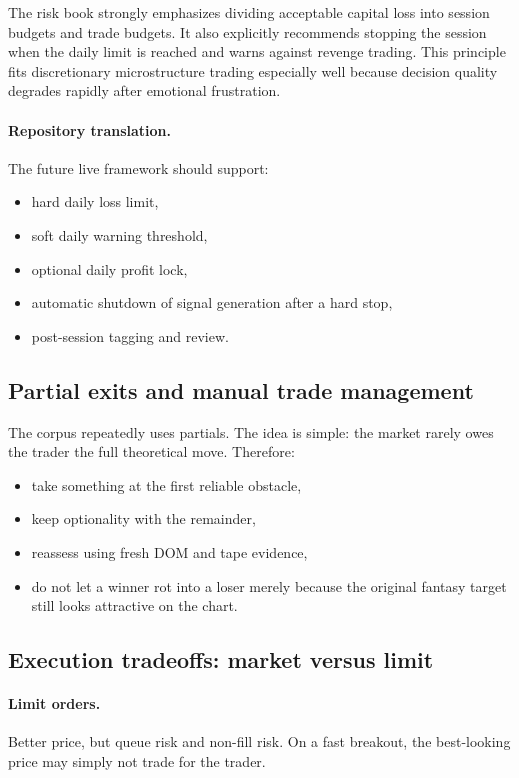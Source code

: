 The risk book strongly emphasizes dividing acceptable capital loss into session budgets and trade budgets. It also explicitly recommends stopping the session when the daily limit is reached and warns against revenge trading. This principle fits discretionary microstructure trading especially well because decision quality degrades rapidly after emotional frustration.

\paragraph{Repository translation.} The future live framework should support:

\begin{itemize}
\item hard daily loss limit,
\item soft daily warning threshold,
\item optional daily profit lock,
\item automatic shutdown of signal generation after a hard stop,
\item post-session tagging and review.
\end{itemize}

\subsection{Partial exits and manual trade management}

The corpus repeatedly uses partials. The idea is simple: the market rarely owes the trader the full theoretical move. Therefore:

\begin{itemize}
\item take something at the first reliable obstacle,
\item keep optionality with the remainder,
\item reassess using fresh DOM and tape evidence,
\item do not let a winner rot into a loser merely because the original fantasy target still looks attractive on the chart.
\end{itemize}

\subsection{Execution tradeoffs: market versus limit}

\paragraph{Limit orders.} Better price, but queue risk and non-fill risk. On a fast breakout, the best-looking price may simply not trade for the trader.

